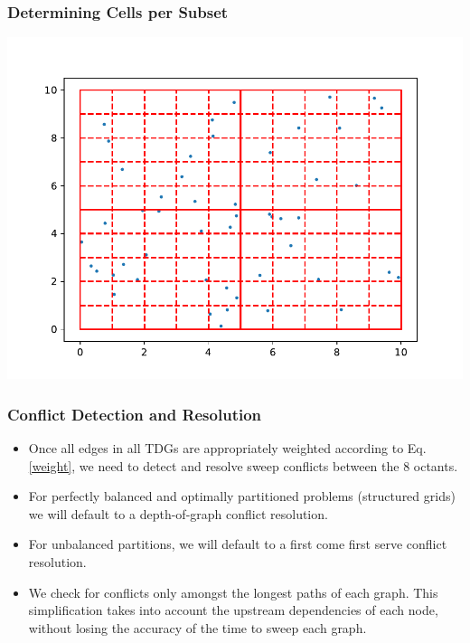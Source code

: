 \documentclass[xcolor={usenames,dvipsnames,svgnames,table}]{beamer}
\begin{document}
\begin{frame}[t]\frametitle{Determining Cells per Subset}
	\centering
	\includegraphics[scale=0.65]{figures/full_mesh_density.pdf}
\end{frame}

\begin{frame}[t]\frametitle{Conflict Detection and Resolution}
\begin{block}{}
\begin{itemize}
	\item Once all edges in all TDGs are appropriately weighted according to Eq. \ref{weight}, we need to detect and resolve sweep conflicts between the 8 octants.
	\item For perfectly balanced and optimally partitioned problems (structured grids) we will default to a depth-of-graph conflict resolution.
	\item For unbalanced partitions, we will default to a first come first serve conflict resolution.
    \item We check for conflicts only amongst the longest paths of each graph. This simplification takes into account the upstream dependencies of each node, without losing the accuracy of the time to sweep each graph.
\end{itemize}
\end{block}
\end{frame}
\end{document}
